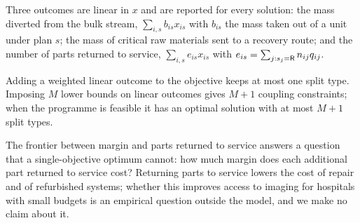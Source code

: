 Three outcomes are linear in $x$ and are reported for every solution: the mass diverted from the bulk stream,
$\sum_{i,s}b_{is}x_{is}$ with $b_{is}$ the mass taken out of a unit under plan $s$; the mass of critical raw
materials sent to a recovery route; and the number of parts returned to service, $\sum_{i,s}e_{is}x_{is}$ with
$e_{is}=\sum_{j:s_j=\mathsf{R}}n_{ij}q_{ij}$.

\begin{corollary}[Frontier]\label{cor:frontier}
Adding a weighted linear outcome to the objective keeps at most one split type. Imposing $M$ lower bounds on linear
outcomes gives $M+1$ coupling constraints; when the programme is feasible it has an optimal solution with at most
$M+1$ split types.
\end{corollary}

The frontier between margin and parts returned to service answers a question that a single-objective optimum
cannot: how much margin does each additional part returned to service cost? Returning parts to service lowers the
cost of repair and of refurbished systems; whether this improves access to imaging for hospitals with small budgets
is an empirical question outside the model, and we make no claim about it.
